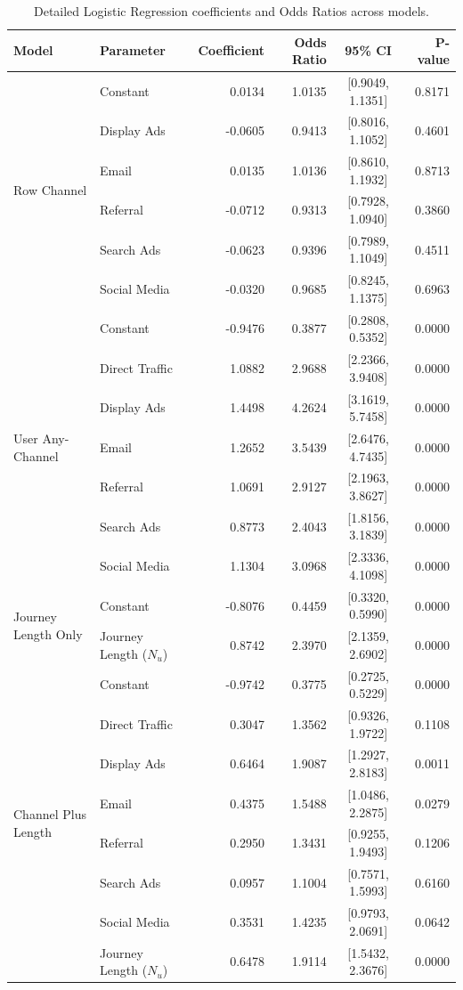 \documentclass[pdflatex,sn-basic,Numbered]{sn-jnl}
\begin{document}
\begin{table}[htbp]
\centering
\caption{Detailed Logistic Regression coefficients and Odds Ratios across models.}
\label{tab:logitcoefs}
\begin{small}
\begin{tabular}{l l r r c r}
\toprule
Model & Parameter & Coefficient & Odds Ratio & 95\% CI & P-value \\
\midrule
\multirow{6}{*}{Row Channel} 
 & Constant & 0.0134 & 1.0135 & [0.9049, 1.1351] & 0.8171 \\
 & Display Ads & -0.0605 & 0.9413 & [0.8016, 1.1052] & 0.4601 \\
 & Email & 0.0135 & 1.0136 & [0.8610, 1.1932] & 0.8713 \\
 & Referral & -0.0712 & 0.9313 & [0.7928, 1.0940] & 0.3860 \\
 & Search Ads & -0.0623 & 0.9396 & [0.7989, 1.1049] & 0.4511 \\
 & Social Media & -0.0320 & 0.9685 & [0.8245, 1.1375] & 0.6963 \\
\midrule
\multirow{7}{*}{User Any-Channel} 
 & Constant & -0.9476 & 0.3877 & [0.2808, 0.5352] & 0.0000 \\
 & Direct Traffic & 1.0882 & 2.9688 & [2.2366, 3.9408] & 0.0000 \\
 & Display Ads & 1.4498 & 4.2624 & [3.1619, 5.7458] & 0.0000 \\
 & Email & 1.2652 & 3.5439 & [2.6476, 4.7435] & 0.0000 \\
 & Referral & 1.0691 & 2.9127 & [2.1963, 3.8627] & 0.0000 \\
 & Search Ads & 0.8773 & 2.4043 & [1.8156, 3.1839] & 0.0000 \\
 & Social Media & 1.1304 & 3.0968 & [2.3336, 4.1098] & 0.0000 \\
\midrule
\multirow{2}{*}{Journey Length Only} 
 & Constant & -0.8076 & 0.4459 & [0.3320, 0.5990] & 0.0000 \\
 & Journey Length ($N_u$) & 0.8742 & 2.3970 & [2.1359, 2.6902] & 0.0000 \\
\midrule
\multirow{8}{*}{Channel Plus Length} 
 & Constant & -0.9742 & 0.3775 & [0.2725, 0.5229] & 0.0000 \\
 & Direct Traffic & 0.3047 & 1.3562 & [0.9326, 1.9722] & 0.1108 \\
 & Display Ads & 0.6464 & 1.9087 & [1.2927, 2.8183] & 0.0011 \\
 & Email & 0.4375 & 1.5488 & [1.0486, 2.2875] & 0.0279 \\
 & Referral & 0.2950 & 1.3431 & [0.9255, 1.9493] & 0.1206 \\
 & Search Ads & 0.0957 & 1.1004 & [0.7571, 1.5993] & 0.6160 \\
 & Social Media & 0.3531 & 1.4235 & [0.9793, 2.0691] & 0.0642 \\
 & Journey Length ($N_u$) & 0.6478 & 1.9114 & [1.5432, 2.3676] & 0.0000 \\
\bottomrule
\end{tabular}
\end{small}
\end{table}
\end{document}
